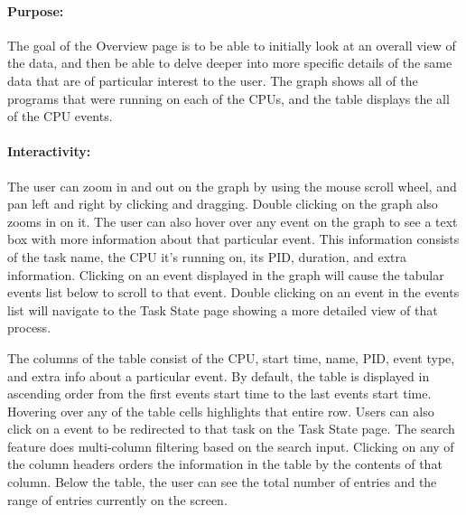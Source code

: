 \documentclass{hmcclinic}
\begin{document}
\paragraph{Purpose:} 
The goal of the Overview page is to be able to initially look at an overall view
of the data, and then be able to delve deeper into more specific details of the
same data that are of particular interest to the user. The graph shows all of 
the programs that were running on each of the CPUs, and the table displays 
the all of the CPU events.

\paragraph{Interactivity:} The user can zoom in and out on the graph by using the mouse scroll wheel, and pan left and right by clicking and dragging. Double clicking on the graph also zooms in on it. The user can also hover over any event on the graph to see a text box with more information about that particular event. This information consists of the task name, the CPU it's running on, its PID, duration, and extra information. Clicking on an event displayed in the graph will cause the tabular events list below to scroll to that event. Double clicking on an event in the events list will navigate to the Task State page showing a more detailed view of that process.

The columns of the table consist of the CPU, start time, name, PID, event type, and extra info about a particular event. By default, the table is displayed in ascending order from the first events start time to the last events start time. Hovering over any of the table cells highlights that entire row. Users can also click on a event to be redirected to that task on the Task State page. The search feature does multi-column filtering based on the search input. Clicking on any of the column headers orders the information in the table by the contents of that column. Below the table, the user can see the total number of entries and the range of entries currently on the screen.
\end{document}
